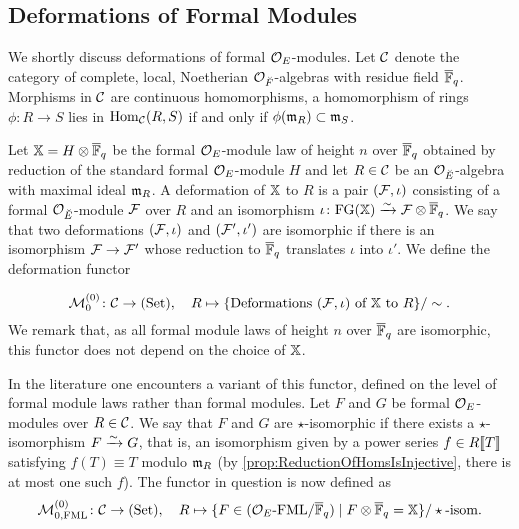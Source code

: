 \documentclass[../main.tex]{subfiles}
\begin{document}
\subsection{Deformations of Formal Modules} %
\label{sub:Deformations of Formal Modules}
We shortly discuss deformations of formal $\mathcal{O}_E$-modules.
Let $\mathcal{C}$ denote the category of complete, local, Noetherian
$\mathcal{O}_{\breve {F}}$-algebras with residue field $\overline {\mathbb{F}}_q$. Morphisms in $\mathcal{C}$ are continuous
homomorphisms, a homomorphism of rings $\phi: R \to S$ lies in 
$\operatorname{Hom}_{\mathcal{C}}(R,S)$ if and only if $\phi(\mathfrak{m}_R) \subset \mathfrak{m}_S$.

Let $\mathbb{X} = H \otimes {\overline{\mathbb{F}}_q}$ be the formal $\mathcal{O}_E$-module law of height $n$
over ${\overline {\mathbb{F}}_q}$ obtained by reduction of the standard formal $\mathcal{O}_E$-module $H$
and let $R \in \mathcal{C}$ be an $\mathcal{O}_{\breve {E}}$-algebra with maximal ideal $\mathfrak{m}_R$. A
deformation
of $\mathbb{X}$ to $R$ is a pair $(\mathcal{F}, \iota)$ consisting of a formal $\mathcal{O}_{\breve {E}}$-module $\mathcal{F}$ over $R$ and an isomorphism $\iota\colon \textnormal{FG}(\mathbb{X}) \xrightarrow{\sim}
\mathcal{F} \otimes {\overline{\mathbb{F}}_q}$. We say that two deformations $(\mathcal{F}, \iota)$ and $(\mathcal{F}',
\iota')$ are isomorphic if there is an isomorphism $\mathcal{F} \to \mathcal{F}'$ whose
reduction to ${\overline {\mathbb{F}}_q}$ translates $\iota$ into $\iota'$. We define the 
deformation functor

\begin{equation*}
  \mathcal{M}^{(0)}_0 \colon \mathcal{C} \to {(\mathrm{Set})}, \quad R \mapsto \{\text{Deformations $(\mathcal{F},
  \iota)$ of $\mathbb{X}$ to $R$}\}/\sim.
\end{equation*}
We remark that, as all formal module laws of height $n$ over ${\overline {\mathbb{F}}_q}$ are 
isomorphic, this functor does not depend on the choice of $\mathbb{X}$.

In the literature one encounters a variant of this functor, defined on the
level of formal
module laws rather than formal modules. Let $F$ and $G$ be formal $\mathcal{O}_E$-modules over
$R \in \mathcal{C}$. We say that $F$ and $G$ are $\star$-isomorphic if there exists a 
$\star$-isomorphism $F \xrightarrow{\sim} G$, that is, an isomorphism given by a power series
$f \in R\llbracket T \rrbracket$ satisfying $f(T) \equiv T$ modulo $\mathfrak{m}_R$ (by
\cref{prop:ReductionOfHomsIsInjective}, there is at most one such $f$).
The functor in question is now defined as 
\begin{equation*}
  \mathcal{M}^{(0)}_{0, \text{FML}} \colon \mathcal{C} \to {(\mathrm{Set})}, \quad R \mapsto \{F \in {({\mathcal{O}_E}\textnormal-\allowbreak\mathrm{FML}/{{\overline{\mathbb{F}}_q}})} \mid
  F \otimes {\overline{\mathbb{F}}_q} = \mathbb{X}\} / \star\text{-isom.}
\end{equation*}
\end{document}
